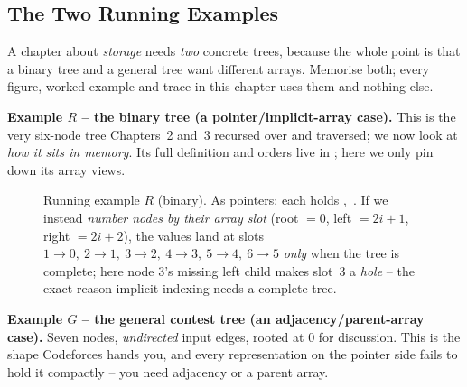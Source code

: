 \subsection*{The Two Running Examples}

A chapter about \emph{storage} needs \emph{two} concrete trees, because the whole point
is that a binary tree and a general tree want different arrays. Memorise both; every
figure, worked example and trace in this chapter uses them and nothing else.

\medskip
\noindent\textbf{Example $R$ -- the binary tree (a pointer/implicit-array case).}
This is the very six-node tree Chapters~2 and~3 recursed over and traversed; we now look
at \emph{how it sits in memory}. Its full definition and orders live in
; here we only pin down its array views.

\begin{figure}[H]
\centering
{}
\caption{Running example $R$ (binary). As pointers: each  holds
,\ . If we instead \emph{number nodes by their array slot}
(root $=0$, left $=2i{+}1$, right $=2i{+}2$), the values land at slots
$1\!\to\!0,\ 2\!\to\!1,\ 3\!\to\!2,\ 4\!\to\!3,\ 5\!\to\!4,\ 6\!\to\!5$ \emph{only}
when the tree is complete; here node $3$'s missing left child makes slot~3 a
\emph{hole} -- the exact reason implicit indexing needs a complete tree.}\label{fig:c04-running-r}
\end{figure}

\medskip
\noindent\textbf{Example $G$ -- the general contest tree (an adjacency/parent-array case).}
Seven nodes, \emph{undirected} input edges, rooted at $0$ for discussion. This is the
shape Codeforces hands you, and every representation on the pointer side fails to hold
it compactly -- you need adjacency or a parent array.

